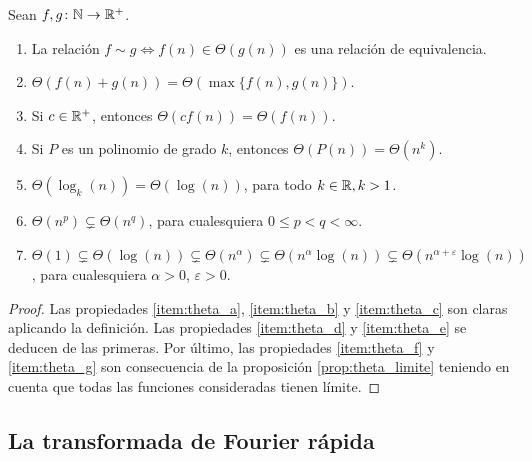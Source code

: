 \documentclass{article}
\begin{document}
\begin{prop}
Sean $f,g\colon \mathbb{N} \to \mathbb{R}^+$.
\begin{enumerate}
    \item La relación $f \sim g \iff f(n) \in \Theta(g(n))$ es una relación de equivalencia. \label{item:theta_a}
    \item $\Theta(f(n)+g(n)) = \Theta(\max\{f(n),g(n)\})$. \label{item:theta_b}
    \item Si $c \in \mathbb{R}^+$, entonces $\Theta(cf(n)) = \Theta(f(n))$. \label{item:theta_c}
    \item Si $P$ es un polinomio de grado $k$, entonces $\Theta(P(n)) = \Theta(n^k)$. \label{item:theta_d}
    \item $\Theta(\log_k(n))=\Theta(\log(n))$, para todo $k\in\mathbb{R}, k > 1$. \label{item:theta_e}
    \item $\Theta(n^p) \subsetneq \Theta(n^q)$, para cualesquiera $0 \le p < q <  \infty$. \label{item:theta_f}
    \item $\Theta(1) \subsetneq \Theta(\log(n)) \subsetneq \Theta(n^{\alpha}) \subsetneq \Theta(n^{\alpha}\log(n))  \subsetneq \Theta(n^{\alpha+\varepsilon}\log(n)) $, para cualesquiera $\alpha > 0$, $\varepsilon > 0$. \label{item:theta_g}
    
\end{enumerate}
\end{prop}

\begin{proof}
    Las propiedades \ref{item:theta_a}, \ref{item:theta_b} y \ref{item:theta_c} son claras aplicando la definición. Las propiedades \ref{item:theta_d} y \ref{item:theta_e} se deducen de las primeras. Por último, las propiedades \ref{item:theta_f} y \ref{item:theta_g} son consecuencia de la proposición \ref{prop:theta_limite} teniendo en cuenta que todas las funciones consideradas tienen límite. 
\end{proof}

\subsection{La transformada de Fourier rápida} \label{sec:fft:fft}
\end{document}

